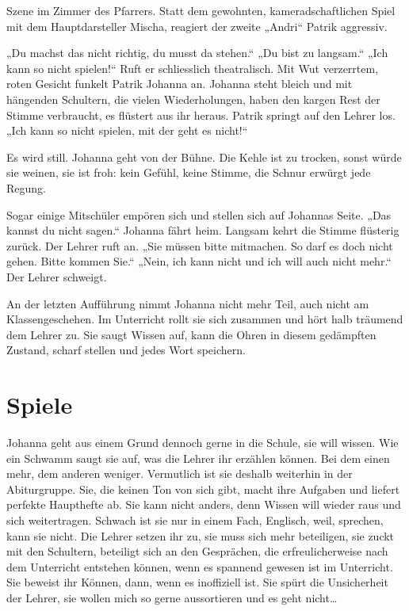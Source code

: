 \documentclass[10pt,a5paper]{book}
\begin{document}
Szene im Zimmer des Pfarrers. Statt dem gewohnten, kameradschaftlichen Spiel mit dem Hauptdarsteller Mischa, reagiert der zweite „Andri“ Patrik aggressiv. 

„Du machst das nicht richtig, du musst da stehen.“ „Du bist zu langsam.“ „Ich kann so nicht spielen!“ Ruft er schliesslich theatralisch. Mit Wut verzerrtem, roten Gesicht funkelt Patrik  Johanna an. Johanna steht bleich und mit hängenden Schultern, die vielen Wiederholungen, haben den kargen Rest der Stimme verbraucht, es flüstert aus ihr heraus. Patrik springt auf den Lehrer los. „Ich kann so nicht spielen, mit der geht es nicht!“

Es wird still. Johanna geht von der Bühne. Die Kehle ist zu trocken, sonst würde sie weinen, sie ist froh: kein Gefühl, keine Stimme, die Schnur erwürgt jede Regung. 

Sogar einige Mitschüler empören sich und stellen sich auf Johannas Seite. „Das kannst du nicht sagen.“ Johanna fährt heim. Langsam kehrt die Stimme flüsterig zurück. Der Lehrer ruft an. „Sie müssen bitte mitmachen. So darf es doch nicht gehen. Bitte kommen Sie.“ „Nein, ich kann nicht und ich will auch nicht mehr.“ Der Lehrer schweigt.

An der letzten Aufführung nimmt Johanna nicht mehr Teil, auch nicht am Klassengeschehen. Im Unterricht rollt sie sich zusammen und hört halb träumend dem Lehrer zu. Sie saugt Wissen auf, kann die Ohren in diesem gedämpften Zustand, scharf stellen und jedes Wort speichern. 



\section*{Spiele}


Johanna geht aus einem Grund dennoch gerne in die Schule, sie will wissen. Wie ein Schwamm saugt sie auf, was die Lehrer ihr erzählen können. Bei dem einen mehr, dem anderen weniger. Vermutlich ist sie deshalb weiterhin in der Abiturgruppe. Sie, die keinen Ton von sich gibt, macht ihre Aufgaben und liefert perfekte Haupthefte ab. Sie kann nicht anders, denn Wissen will wieder raus und sich weitertragen. Schwach ist sie nur in einem Fach, Englisch, weil, sprechen, kann sie nicht. Die Lehrer setzen ihr zu, sie muss sich mehr beteiligen, sie zuckt mit den Schultern, beteiligt sich an den Gesprächen, die erfreulicherweise nach dem Unterricht entstehen können, wenn es spannend gewesen ist im Unterricht. Sie beweist ihr Können, dann, wenn es inoffiziell ist. Sie spürt die Unsicherheit der Lehrer, sie wollen mich so gerne aussortieren und es geht nicht\dots 
\end{document}
